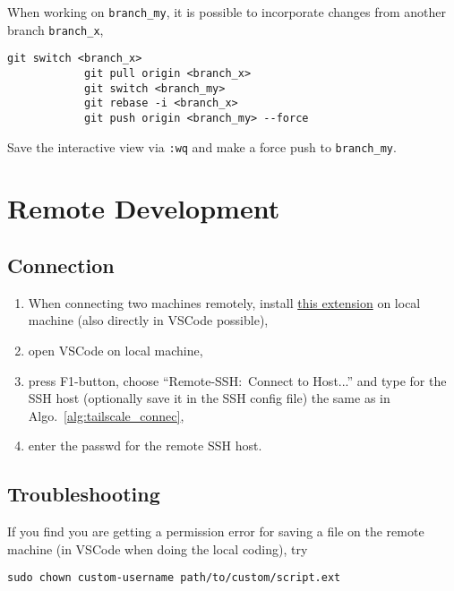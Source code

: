 \documentclass[12pt, a4paper]{scrbook}
\numberwithin{equation}{section}
\theoremstyle{definition}
\theoremstyle{definition}
\begin{document}
		When working on \texttt{branch\_my}, it is possible to incorporate changes from another branch \texttt{branch\_x}, 

		\begin{lstlisting}[style=mystylebash, xleftmargin=\parindent]
			git switch <branch_x>
			git pull origin <branch_x>
			git switch <branch_my>
			git rebase -i <branch_x>
			git push origin <branch_my> --force
		\end{lstlisting}
		
		Save the interactive view via \texttt{:wq} and make a force push to \texttt{branch\_my}. 
	
	\chapter{Remote Development}
	
	\section{Connection}
	
		\begin{enumerate}
			\item When connecting two machines remotely, install \href{https://marketplace.visualstudio.com/items?itemName=ms-vscode-remote.vscode-remote-extensionpack}{this extension} on local machine (also directly in VSCode possible), 
			\item open VSCode on local machine, 
			\item press F1-button, choose \enquote{Remote-SSH:~Connect to Host...} and type for the SSH host (optionally save it in the SSH config file) the same as in Algo.~\eqref{alg:tailscale_connec}, 
			\item enter the passwd for the remote SSH host. 
		\end{enumerate}	

	\section{Troubleshooting}

		If you find you are getting a permission error for saving a file on the remote machine (in VSCode when doing the local coding), try
		
		\begin{lstlisting}[style=mystylebash, label=alg:remote_troubleshooting, xleftmargin=\parindent]
			sudo chown custom-username path/to/custom/script.ext
		\end{lstlisting}
		
\end{document}
